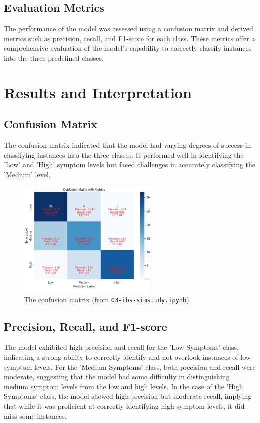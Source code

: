 \documentclass[10pt, oneside]{article}   	%
\begin{document}
\subsection{Evaluation Metrics}
The performance of the model was assessed using a confusion matrix and derived metrics such as precision, recall, and F1-score for each class. These metrics offer a comprehensive evaluation of the model's capability to correctly classify instances into the three predefined classes.

\section{Results and Interpretation}

\subsection{Confusion Matrix}
The confusion matrix indicated that the model had varying degrees of success in classifying instances into the three classes. It performed well in identifying the 'Low' and 'High' symptom levels but faced challenges in accurately classifying the 'Medium' level.

\begin{figure}[H]
   \centering
   \includegraphics[width=0.60\textwidth]{res_14.png} %
   \caption{The confusion matrix (from {\tt 03-ibs-simstudy.ipynb})}
   \label{fig:isb-cm}
\end{figure}

\subsection{Precision, Recall, and F1-score}
The model exhibited high precision and recall for the 'Low Symptoms' class, indicating a strong ability to correctly identify and not overlook instances of low symptom levels. For the 'Medium Symptoms' class, both precision and recall were moderate, suggesting that the model had some difficulty in distinguishing medium symptom levels from the low and high levels. In the case of the 'High Symptoms' class, the model showed high precision but moderate recall, implying that while it was proficient at correctly identifying high symptom levels, it did miss some instances.
\end{document}
